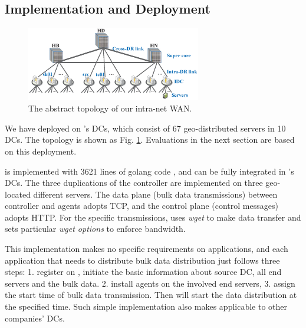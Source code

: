 \subsection{Implementation and Deployment}
\label{sec:deployment}

\begin{figure}[t]
  \centering
  \includegraphics[width=3in]{images/Testbed_v2.eps}
  \caption{The abstract topology of our intra-net WAN.}
  \label{fig:topology}
\end{figure}

We have deployed \name on \company's DCs, which consist of 67 geo-distributed servers in 10 DCs. The topology is shown as Fig. \ref{fig:topology}. Evaluations in the next section are based on this deployment.

\name is implemented with 3621 lines of golang code \cite{golang}, and can be fully integrated in \company's DCs. The three duplications of the controller are implemented on three geo-located different servers. The data plane (bulk data transmissions) between controller and agents adopts TCP, and the control plane (control messages) adopts HTTP. For the specific transmissions, \name uses \emph{wget} to make data transfer and sets particular \emph{wget options} to enforce bandwidth.

This implementation makes no specific requirements on applications, and each application that needs to distribute bulk data distribution just follows three steps: 1. register on \name, initiate the basic information about source DC, all end servers and the bulk data. 2. install agents on the involved end servers, 3. assign the start time of bulk data transmission. Then \name will start the data distribution at the specified time. Such simple implementation also makes \name applicable to other companies' DCs. 	



